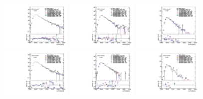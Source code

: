 \begin{figure}[htbp!]
\begin{center}
\includegraphics[width=0.3\textwidth,angle=-90]{figures/boosted/AppendixReweight/Compare/Data_TwoTag_split_Sideband_directcompare_mHH_l_1.pdf}
\includegraphics[width=0.3\textwidth,angle=-90]{figures/boosted/AppendixReweight/Compare/Data_ThreeTag_Sideband_directcompare_mHH_l_1.pdf}
\includegraphics[width=0.3\textwidth,angle=-90]{figures/boosted/AppendixReweight/Compare/Data_FourTag_Sideband_directcompare_mHH_l_1.pdf}\\
\includegraphics[width=0.3\textwidth,angle=-90]{figures/boosted/AppendixReweight/Compare/Data_TwoTag_split_Control_directcompare_mHH_l_1.pdf}
\includegraphics[width=0.3\textwidth,angle=-90]{figures/boosted/AppendixReweight/Compare/Data_ThreeTag_Control_directcompare_mHH_l_1.pdf}
\includegraphics[width=0.3\textwidth,angle=-90]{figures/boosted/AppendixReweight/Compare/Data_FourTag_Control_directcompare_mHH_l_1.pdf}\\

\end{center}
\end{figure}

